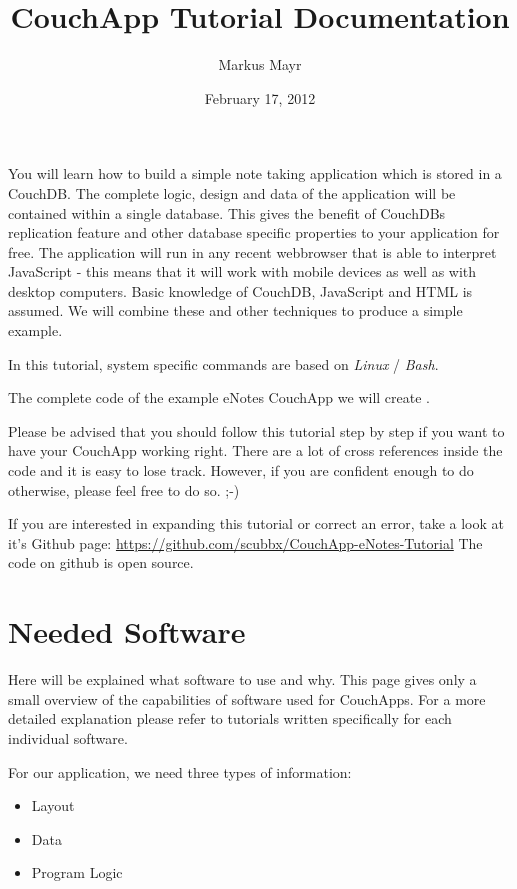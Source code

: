 \documentclass[letterpaper,10pt,english]{sphinxmanual}
\title{CouchApp Tutorial Documentation}
\date{February 17, 2012}
\author{Markus Mayr}
\begin{document}
\maketitle
\tableofcontents
{}\label{index::doc}


You will learn how to build a simple note taking application which is stored in a CouchDB. The complete logic, design and data of the application will be contained within a single database. This gives the benefit of CouchDBs replication feature and other database specific properties to your application for free.
The application will run in any recent webbrowser that is able to interpret JavaScript - this means that it will work with mobile devices as well as with desktop computers.
Basic knowledge of CouchDB, JavaScript and HTML is assumed. We will combine these and other techniques to produce a simple example.

In this tutorial, system specific commands are based on \emph{Linux} / \emph{Bash}.

The complete code of the example eNotes CouchApp we will create .

Please be advised that you should follow this tutorial step by step if you want to have your CouchApp working right. There are a lot of cross references inside the code and it is easy to lose track. However, if you are confident enough to do otherwise, please feel free to do so. ;-)

If you are interested in expanding this tutorial or correct an error, take a look at it's Github page: \href{https://github.com/scubbx/CouchApp-eNotes-Tutorial}{https://github.com/scubbx/CouchApp-eNotes-Tutorial}
The code on github is open source.


\chapter{Needed Software}
\label{1-UsedSoftware:needed-software}\label{1-UsedSoftware::doc}\label{1-UsedSoftware:welcome-to-the-couchapp-tutorial}
Here will be explained what software to use and why. This page gives only a small overview of the capabilities of software used for CouchApps. For a more detailed explanation please refer to tutorials written specifically for each individual software.

For our application, we need three types of information:
\begin{itemize}
\item {} 
Layout

\item {} 
Data

\item {} 
Program Logic

\end{itemize}
\end{document}
